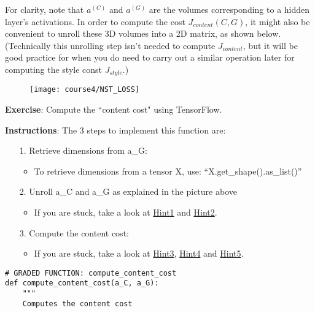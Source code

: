For clarity, note that $a^{(C)}$ and $a^{(G)}$ are the volumes corresponding to a hidden layer's activations. In order to compute the cost $J_{content}(C,G)$, it might also be convenient to unroll these 3D volumes into a 2D matrix, as shown below. (Technically this unrolling step isn't needed to compute $J_{content}$, but it will be good practice for when you do need to carry out a similar operation later for computing the style const $J_{style}$.)
\clearpage
\begin{figure}[h]
\begin{center}
\texttt{[image: course4/NST\_LOSS]}
\end{center}
\end{figure}


{\textbf{Exercise}: Compute the ``content cost" using TensorFlow. 

{\textbf{Instructions}}: The 3 steps to implement this function are:
\begin{itemize}
\item[1.] Retrieve dimensions from a\_G: 
    \begin{itemize}
    \item To retrieve dimensions from a tensor X, use: ``X.get\_shape().as\_list()''
    \end{itemize}
\item[2.] Unroll a\_C and a\_G as explained in the picture above
    \begin{itemize}
    \item If you are stuck, take a look at \href{https://www.tensorflow.org/versions/r1.3/api_docs/python/tf/transpose}{Hint1} and \href{https://www.tensorflow.org/versions/r1.2/api_docs/python/tf/reshape}{Hint2}.
    \end{itemize}
\item[3.] Compute the content cost:
    \begin{itemize}
    \item If you are stuck, take a look at \href{https://www.tensorflow.org/api_docs/python/tf/reduce_sum}{Hint3}, \href{https://www.tensorflow.org/api_docs/python/tf/square}{Hint4} and \href{https://www.tensorflow.org/api_docs/python/tf/subtract}{Hint5}.
    \end{itemize}
\end{itemize}

\begin{verbatim}
# GRADED FUNCTION: compute_content_cost
def compute_content_cost(a_C, a_G):
    """
    Computes the content cost
    

\end{verbatim}}
